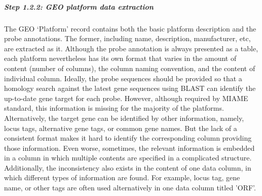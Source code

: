 \subparagraph{Step 1.2.2:  GEO platform data extraction} The GEO `Platform' record contains both the basic platform description and the probe annotations. The former, including name, description, manufacturer, etc, are extracted as it. Although the probe annotation is always presented as a table, each platform nevertheless has its own format that varies in the amount of content (number of columns), the column naming convention, and the content of individual column. Ideally, the probe sequences should be provided so that a homology search against the latest gene sequences using BLAST \cite{Altschul1997} can identify the up-to-date gene target for each probe. However, although required by MIAME\cite{Brazma2001} standard, this information is missing for the majority of the platforms. Alternatively, the target gene can be identified by other information, namely, locus tags, alternative gene tags, or common gene names. But the lack of a consistent format makes it hard to identify the corresponding column providing those information. Even worse, sometimes, the relevant information is embedded in a column in which multiple contents are specified in a complicated structure. Additionally, the inconsistency also exists in the content of one data column, in which different types of information are found. For example, locus tag, gene name, or other tags are often used alternatively in one data column titled 'ORF'. 

